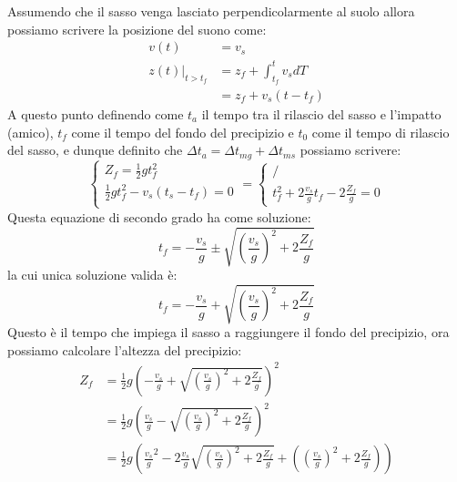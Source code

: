         Assumendo che il sasso venga lasciato perpendicolarmente al suolo allora possiamo scrivere la posizione del suono come:
        $$
            \begin{aligned}
                v(t)&=v_s\\
                z(t)|_{t>t_f}&=z_f + \int_{t_f}^t v_s dT\\
                &= z_f + v_s(t-t_f)
            \end{aligned}
        $$
        A questo punto definendo come $t_a$ il tempo tra il rilascio del sasso e l'impatto (amico), $t_f$ come il tempo del fondo del precipizio e $t_0$ come il tempo di rilascio del sasso, e dunque definito che $\Delta t_a = \Delta t_{mg} + \Delta t_{ms} $ possiamo scrivere:
        $$
            \begin{cases}
                Z_f = \frac{1}{2}gt_f^2\\
                \frac{1}{2}gt_f^2 - v_s(t_s-t_f) = 0\\
            \end{cases} = 
            \begin{cases}
                /\\
                t_f^2+2\frac{v_s}{g}t_f - 2\frac{Z_f}{g} = 0
            \end{cases}
        $$
        Questa equazione di secondo grado ha come soluzione:
        $$
            t_f = -\frac{v_s}{g} \pm \sqrt{\left(\frac{v_s}{g}\right)^2 + 2\frac{Z_f}{g}}
        $$
        la cui unica soluzione valida è:
        $$
            t_f = -\frac{v_s}{g} + \sqrt{\left(\frac{v_s}{g}\right)^2 + 2\frac{Z_f}{g}}
        $$
        Questo è il tempo che impiega il sasso a raggiungere il fondo del precipizio, ora possiamo calcolare l'altezza del precipizio:
        $$
            \begin{aligned}
                Z_f &= \frac{1}{2}g\left(-\frac{v_s}{g} + \sqrt{\left(\frac{v_s}{g}\right)^2 + 2\frac{Z_f}{g}}\right)^2\\
                &= \frac{1}{2}g\left(\frac{v_s}{g} - \sqrt{\left(\frac{v_s}{g}\right)^2 + 2\frac{Z_f}{g}}\right)^2\\
                &= \frac{1}{2}g\left({\frac{v_s}{g}}^2 - 2\frac{v_s}{g}\sqrt{\left(\frac{v_s}{g}\right)^2 + 2\frac{Z_f}{g}} + \left(\left(\frac{v_s}{g}\right)^2 + 2\frac{Z_f}{g}\right)\right) \\
            \end{aligned}
        $$